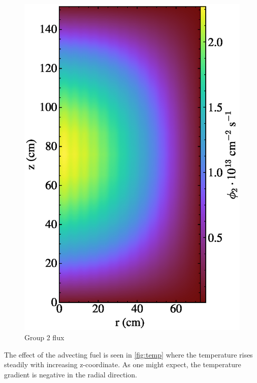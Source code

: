 \documentclass{article}
\begin{document}
\begin{figure}
  \centering
  \includegraphics{auto_diff_rho_group2.eps}
  \caption{Group 2 flux}
  \label{fig:group2}
\end{figure}

The effect of the advecting fuel is seen in \cref{fig:temp} where the temperature
rises steadily with increasing z-coordinate. As one might expect, the temperature
gradient is negative in the radial direction.
\end{document}
